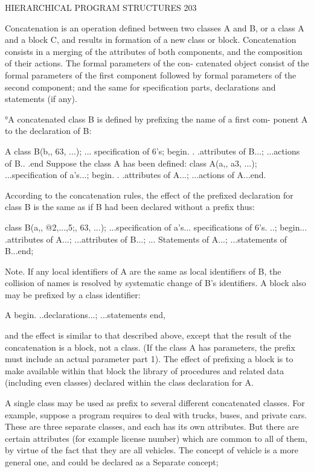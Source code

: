 {{{{{		HIERARCHICAL PROGRAM STRUCTURES 203
		
		Concatenation is an operation defined between two classes A and B, or a class A and a block C, and results in formation of a new class or block. Concatenation consists in a merging of the attributes of both components, and the composition of their actions. The formal parameters of the con- catenated object consist of the formal parameters of the first component followed by formal parameters of the second component; and the same for specification parts, declarations and statements (if any).
		
		°A concatenated class B is defined by prefixing the name of a first com- ponent A to the declaration of B:
		
		A class B(b,, 63, ...); ... specification of 6’s; begin. . .attributes of B...; ...actions of B.. .end Suppose the class A has been defined: class A(a,, a3, ...); ...specification of a’s...; begin. . .attributes of A...; ...actions of A...end.
		
		According to the concatenation rules, the effect of the prefixed declaration for class B is the same as if B had been declared without a prefix thus:
		
		class B(a,, @2,...,5;, 63, ...); ...specification of a’s... specifications of 6’s. ..; begin... .attributes of A...; ...attributes of B...; ... Statements of A...; ...statements of B...end;
		
		Note. If any local identifiers of A are the same as local identifiers of B, the collision of names is resolved by systematic change of B’s identifiers. A block also may be prefixed by a class identifier:
		
		A begin. ..declarations...; ...statements end,
		
		and the effect is similar to that described above, except that the result of the concatenation is a block, not a class. (If the class A has parameters, the prefix must include an actual parameter part 1). The effect of prefixing a block is to make available within that block the library of procedures and related data (including even classes) declared within the class declaration for A.
		
		A single class may be used as prefix to several different concatenated classes. For example, suppose a program requires to deal with trucks, buses, and private cars. These are three separate classes, and each has its own attributes. But there are certain attributes (for example license number) which are common to all of them, by virtue of the fact that they are all vehicles. The concept of vehicle is a more general one, and could be declared as a Separate concept;
		
}}}}}
